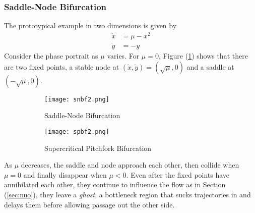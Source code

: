 \subsubsection{Saddle-Node Bifurcation}{\label{sec:snbf2}}
The prototypical example in two dimensions is given by
\begin{equation}
	\begin{aligned}
		\dot{x}&=\mu-x^2\\
		\dot{y}&=-y
	\end{aligned}
\end{equation}
Consider the phase portrait as $\mu$ varies.
For $\mu=0$, Figure (\ref{fig:snbf2}) shows that there are two fixed points, a stable node at $(\tilde{x},\tilde{y})=(\sqrt{\mu},0)$ and a saddle at $(-\sqrt{\mu},0)$.
\begin{figure}[h!]
	\centering
	\begin{subfigure}{0.45\linewidth}
		\centering
		\texttt{[image: snbf2.png]}
		\caption{Saddle-Node Bifurcation}
		\label{fig:snbf2}
	\end{subfigure}
	\vline
	\begin{subfigure}{0.42\linewidth}
		\centering
		\texttt{[image: spbf2.png]}
		\caption{Supercritical Pitchfork Bifurcation}
		\label{fig:spbf2}
	\end{subfigure}
	\caption{}
\end{figure}
As $\mu$ decreases, the saddle and node approach each other, then collide when $\mu=0$ and finally disappear when $\mu<0$.
Even after the fixed points have annihilated each other, they continue to influence the flow as in Section (\ref{sec:nuo}), they leave a \emph{ghost}, a bottleneck region that sucks trajectories in and delays them before allowing passage out the other side.
